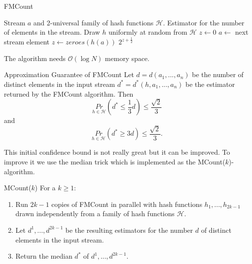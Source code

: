 \documentclass[english]{panikzettel}
\begin{document}
\begin{halfboxl}
\vspace{-\baselineskip}
	\begin{algo}{FMCount}
	{
	\renewcommand{\algorithmicrequire}{\textbf{Input:}}
	\renewcommand{\algorithmicensure}{\textbf{Output:}}
	  \begin{algorithmic}[1]
	    \Require Stream $a$ and 2-universal family of hash functions $\mathcal{H}$.
 	    \Ensure Estimator for the number of elements in the stream.
      \State Draw $h$ uniformly at random from $\mathcal{H}$
	  \State $z\leftarrow 0$
	  	\State $a\leftarrow$ next stream element
	    \State $z\leftarrow zeroes(h(a))$
	    \EndIf
	  \EndWhile
	  \State \Return $2^{z+\frac{1}{2}}$
	  \end{algorithmic}
	}
	\end{algo}

	The algorithm needs $\mathcal{O}(\log N)$ memory space.
\end{halfboxl}
\begin{halfboxr}
	\vspace{-\baselineskip}
	\begin{theo}{Approximation Guarantee of FMCount}
	Let $d=d(a_1,...,a_n)$ be the number of distinct elements in the input stream $d^*=d^*(h,a_1,...,a_n)$ be the estimator returned by the FMCount algorithm. Then
	\[
	\underset{h\in\mathcal{H}}{Pr} \left(d^*\leq \frac{1}{3}d\right) \leq \frac{\sqrt{2}}{3}
	\]
	and
	\[
	\underset{h\in\mathcal{H}}{Pr}(d^* \geq 3d)\leq \frac{\sqrt{2}}{3}.
	\]
	\end{theo}
\end{halfboxr}

This initial confidence bound is not really great but it can be improved. To improve it we use the median trick which is implemented as the MCount($k$)-algorithm.


\begin{algo}{MCount($k$)}
For a $k\geq 1$:
\begin{enumerate}
\item Run $2k-1$ copies of FMCount in parallel with hash functions $h_1,...,h_{2k-1}$ drawn independently from a family of hash functions $\mathcal{H}$.
\item Let $d^1,...,d^{2k-1}$ be the resulting estimators for the number $d$ of distinct elements in the input stream.
\item Return the median $d^*$ of $d^1,...,d^{2k-1}$.
\end{enumerate}
\end{algo}
\end{document}
